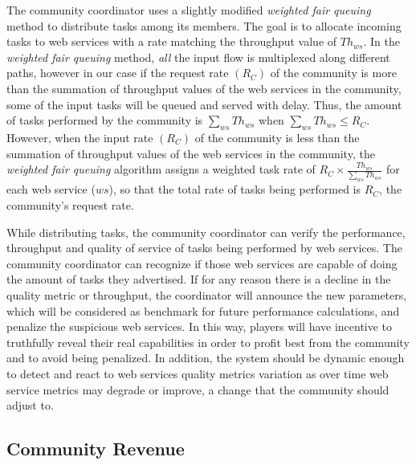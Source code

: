 \documentclass[10pt,journal,cspaper,compsoc]{IEEEtran}
\begin{document}
The community coordinator uses a slightly modified \emph{weighted fair
queuing} method to distribute tasks among its members. The goal is
to allocate incoming tasks to web services with a rate matching
the throughput value of $Th_{ws}$. In the \emph{weighted fair
queuing} method, \emph{all} the input flow is multiplexed along
different paths, however in our case if the request rate $(R_C)$
of the community is more than the summation of throughput values
of the web services in the community, some of the input tasks will
be queued and served with delay. Thus, the amount of tasks
performed by the community is $\sum_{ws}{Th_{ws}}$ when
$\sum_{ws}{Th_{ws}} \leq R_{C}$. However, when the input rate
$(R_C)$ of the community is less than the summation of throughput
values of the web services in the community,
the \emph{weighted fair queuing} algorithm assigns a weighted task
rate of $R_C \times \frac{Th_{ws}}{\sum_{ws}{Th_{ws}}}$ for each
web service ($ws$), so that the total rate of tasks being
performed is $R_C$, the community's request rate.

While distributing tasks, the community coordinator can verify the
performance, throughput and quality of service of tasks being
performed by web services. The community coordinator can recognize if those web
services are capable of doing the amount of tasks they advertised.
If for any reason there is a decline in the quality metric or
throughput, the coordinator will announce the new parameters, which
will be considered as benchmark for future performance
calculations, and penalize the suspicious web services. In this
way, players will have incentive to truthfully reveal their real
capabilities in order to profit best from the community and to
avoid being penalized. In addition, the system should be dynamic
enough to detect and react to web services quality metrics
variation as over time web service metrics may degrade or improve,
a change that the community should adjust to.

\subsection{Community Revenue}
\end{document}
